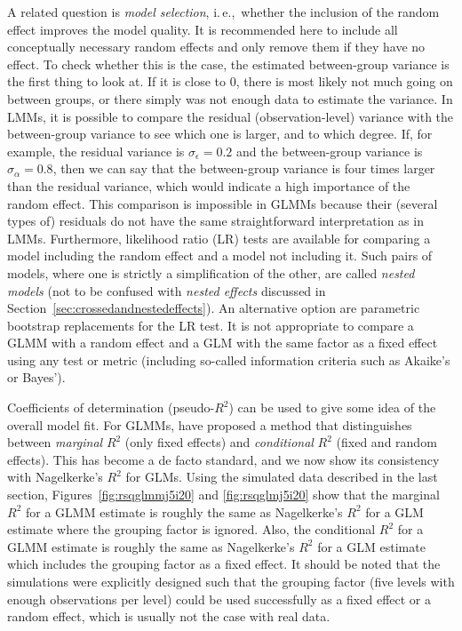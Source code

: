 \documentclass[a4paper,12pt]{article}
\newcommand{\ie}{i.\,e.,\ }
\begin{document}
A related question is \textit{model selection}, \ie whether the inclusion of the random effect improves the model quality.
It is recommended here to include all conceptually necessary random effects and only remove them if they have no effect.
To check whether this is the case, the estimated between-group variance is the first thing to look at.
If it is close to $0$, there is most likely not much going on between groups, or there simply was not enough data to estimate the variance.
In LMMs, it is possible to compare the residual (observation-level) variance with the between-group variance to see which one is larger, and to which degree.
If, for example, the residual variance is $\sigma_{\epsilon}=0.2$ and the between-group variance is $\sigma_{\alpha}=0.8$, then we can say that the between-group variance is four times larger than the residual variance, which would indicate a high importance of the random effect.
This comparison is impossible in GLMMs because their (several types of) residuals do not have the same straightforward interpretation as in LMMs.
Furthermore, likelihood ratio (LR) tests are available for comparing a model including the random effect and a model not including it.
Such pairs of models, where one is strictly a simplification of the other, are called \textit{nested models} (not to be confused with \textit{nested effects} discussed in Section~\ref{sec:crossedandnestedeffects}).
An alternative option are parametric bootstrap replacements for the LR test.
It is not appropriate to compare a GLMM with a random effect and a GLM with the same factor as a fixed effect using any test or metric (including so-called information criteria such as Akaike's or Bayes').

Coefficients of determination (pseudo-$R^2$) can be used to give some idea of the overall model fit.
For GLMMs, \citet{NakagawaSchielzeth2013} have proposed a method that distinguishes between \textit{marginal} $R^2$ (only fixed effects) and \textit{conditional} $R^2$ (fixed and random effects).
This has become a de facto standard, and we now show its consistency with Nagelkerke's $R^2$ for GLMs.
Using the simulated data described in the last section, Figures~\ref{fig:rsqglmmj5i20} and \ref{fig:rsqglmj5i20} show that the marginal $R^2$ for a GLMM estimate is roughly the same as Nagelkerke's $R^2$ for a GLM estimate where the grouping factor is ignored.
Also, the conditional $R^2$ for a GLMM estimate is roughly the same as Nagelkerke's $R^2$ for a GLM estimate which includes the grouping factor as a fixed effect.
It should be noted that the simulations were explicitly designed such that the grouping factor (five levels with enough observations per level) could be used successfully as a fixed effect or a random effect, which is usually not the case with real data.
\end{document}

